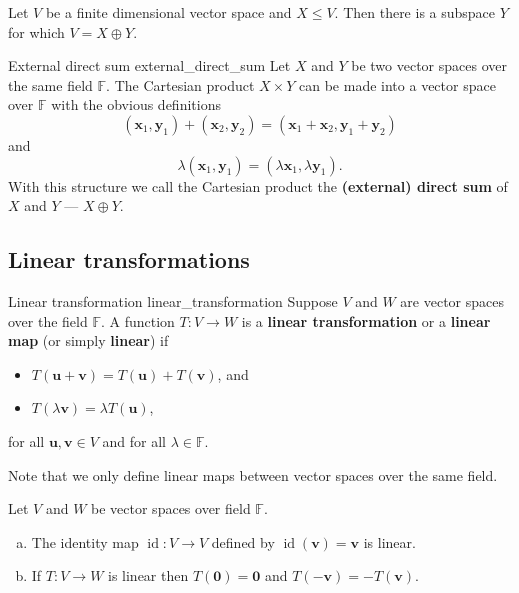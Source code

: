 \begin{lemma}{\cite{math2601_notes}}{}
	Let $V$ be a finite dimensional vector space and $X \leq V$. Then there is a subspace $Y$ for which $V = X \oplus Y$.
\end{lemma}

\begin{definition}{External direct sum \cite{math2601_notes}}{external_direct_sum}
	Let $X$ and $Y$ be two vector									 spaces over the same field $\mathbb{F}$. The Cartesian product $X \times Y$ can be made into a vector space over $\mathbb{F}$ with the obvious definitions
	$$
		(\mathbf{x}_1, \mathbf{y}_1) + (\mathbf{x}_2, \mathbf{y}_2)
		= (\mathbf{x}_1 + \mathbf{x}_2, \mathbf{y}_1 + \mathbf{y}_2)
	$$
	and
	$$ \lambda (\mathbf{x}_1, \mathbf{y}_1) = (\lambda \mathbf{x}_1, \lambda \mathbf{y}_1) . $$
	With this structure we call the Cartesian product the \textbf{(external) direct sum} of $X$ and $Y$ --- $X \oplus Y$.
\end{definition}

\subsection{Linear transformations}

\begin{definition}{Linear transformation \cite{math2601_notes}}{linear_transformation}
	Suppose $V$ and $W$ are vector spaces over the field $\mathbb{F}$. A function $T : V \to W$ is a \textbf{linear transformation} or a \textbf{linear map} (or simply \textbf{linear}) if
	\begin{itemize}
		\item $T(\mathbf{u} + \mathbf{v}) = T(\mathbf{u}) + T(\mathbf{v})$, and
		\item $T(\lambda \mathbf{v}) = \lambda T(\mathbf{u})$,
	\end{itemize}
	for all $\mathbf{u}, \mathbf{v} \in V$ and for all $\lambda \in \mathbb{F}$.
\end{definition}

Note that we only define linear maps between vector spaces over the same field.

\begin{lemma}{\cite{math2601_notes}}{}
	Let $V$ and $W$ be vector spaces over field $\mathbb{F}$.
	\begin{enumerate}[a)]
		\item The identity map $\operatorname{id} : V \to V$ defined by $\operatorname{id} (\mathbf{v}) = \mathbf{v}$ is linear.
		\item If $T : V \to W$ is linear then $T(\mathbf{0}) = \mathbf{0}$ and $T(-\mathbf{v}) = -T (\mathbf{v})$.
	\end{enumerate}
\end{lemma}

